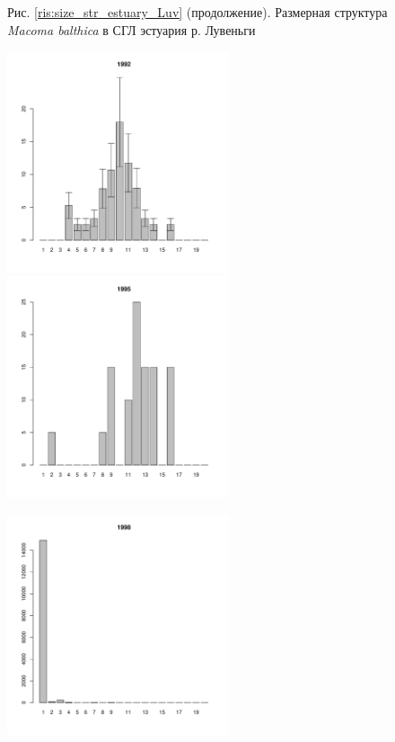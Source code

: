 \documentclass[12pt, a4paper]{article}
\begin{document}
\begin{figure}[h]


\begin{center}
Рис. \ref{ris:size_str_estuary_Luv} (продолжение). Размерная структура {\it Macoma balthica} в СГЛ эстуария р. Лувеньги

\end{center}
\end{figure}

\begin{figure}[h]

\begin{multicols}{3}
\hfill
\includegraphics[width=65mm]{../White_Sea/Luvenga_Goreliy/high_1992_.pdf}
\hfill
\includegraphics[width=65mm]{../White_Sea/Luvenga_Goreliy/high_1995_.pdf}

\hfill
\includegraphics[width=65mm]{../White_Sea/Luvenga_Goreliy/high_1998_.pdf}


\end{multicols}
\end{figure}
\end{document}
